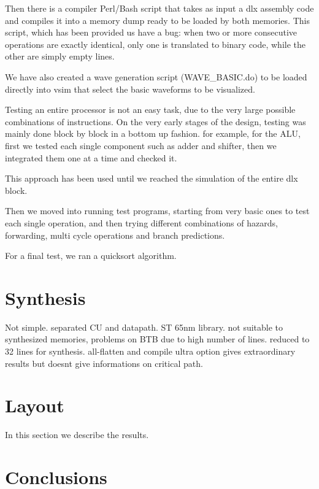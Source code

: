 \documentclass[12pt]{article}
\begin{document}
Then there is a compiler Perl/Bash script that takes as input a dlx assembly code and compiles it into a memory dump ready to be loaded by both memories.
This script, which has been provided us have a bug: when two or more consecutive operations are exactly identical, only one is translated to binary code, while the other are simply empty lines.

We have also created a wave generation script (WAVE\_BASIC.do) to be loaded directly into vsim that select the basic waveforms to be visualized.

Testing an entire processor is not an easy task, due to the very large possible combinations of instructions.
On the very early stages of the design, testing was mainly done block by block in a bottom up fashion. for example, for the ALU, first we tested each single component such as adder and shifter, then we integrated them one at a time and checked it.

This approach has been used until we reached the simulation of the entire dlx block.


Then we moved into running test programs, starting from very basic ones to test each single operation, and then trying different combinations of hazards, forwarding, multi cycle operations and branch predictions.

For a final test, we ran a quicksort algorithm.

  

\section{Synthesis}\label{Synthesis}
Not simple. separated CU and datapath.
ST 65nm library. not suitable to synthesized memories, problems on BTB due to high number of lines. reduced to 32 lines for synthesis. 
all-flatten and compile ultra option gives extraordinary results but doesnt give informations on critical path.



\section{Layout}\label{Layout}
In this section we describe the results.

\section{Conclusions}\label{Conclusions}



\end{document}
